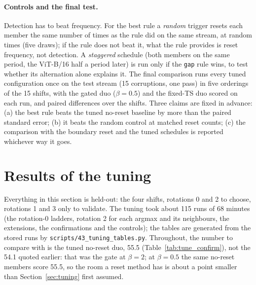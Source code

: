 \documentclass[10pt]{article}
\newcommand{\rl}[1]{\texttt{#1}}
\newcommand{\vit}{ViT-B/16}
\begin{document}
\paragraph{Controls and the final test.} Detection has to beat frequency. For the best rule a \emph{random} trigger resets each member the same number of times as the rule did on the same stream, at random times (five draws); if the rule does not beat it, what the rule provides is reset frequency, not detection. A \emph{staggered} schedule (both members on the same period, the \vit{} half a period later) is run only if the \rl{gap} rule wins, to test whether its alternation alone explains it. The final comparison runs every tuned configuration once on the test stream (15 corruptions, one pass) in five orderings of the 15 shifts, with the gated duo ($\beta = 0.5$) and the fixed-TS duo scored on each run, and paired differences over the shifts. Three claims are fixed in advance: (a) the best rule beats the tuned no-reset baseline by more than the paired standard error; (b) it beats the random control at matched reset counts; (c) the comparison with the boundary reset and the tuned schedules is reported whichever way it goes.

\section{Results of the tuning}\label{sec:tuneresults}
Everything in this section is held-out: the four shifts, rotations 0 and 2 to choose, rotations 1 and 3 only to validate. The tuning took about 115 runs of 68 minutes (the rotation-0 ladders, rotation 2 for each argmax and its neighbours, the extensions, the confirmations and the controls); the tables are generated from the stored runs by \rl{scripts/43\_tuning\_tables.py}. Throughout, the number to compare with is the tuned no-reset duo, 55.5 (Table~\ref{tab:tune_confirm}), not the 54.1 quoted earlier: that was the gate at $\beta = 2$; at $\beta = 0.5$ the same no-reset members score 55.5, so the room a reset method has is about a point smaller than Section~\ref{sec:tuning} first assumed.
\end{document}
